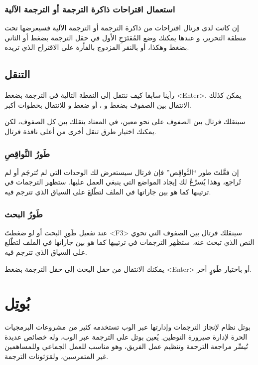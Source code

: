 \subsubsection[ref:36543315]{استعمال اقتراحات ذاكرة الترجمة أو الترجمة الآلية}


إن كانت لدى فرتال اقتراحات من ذاكرة الترجمة أو الترجمة الآلية فسيعرضها
تحت منطقة التحرير، و عندها يمكنك وضع المُقتَرَحِ الأول في حقل الترجمة
بضغط  أو الثاني بضغط  وهكذا، أو بالنقر المزدوج بالفأرة
على الاقتراح الذي تريده.

\subsection{التنقل}
رأينا سابقا كيف ننتقل إلى النقطة التالية في الترجمة بضغط <Enter>. يمكن
كذلك الانتقال بين الصفوف بضغط  و ، أو ضغط
 و  للانتقال بخطوات أكبر.

سينقلك فرتال بين الصفوف على نحو معين، في المعتاد ينقلك بين كل الصفوف،
لكن يمكنك اختيار طرق تنقل أخرى من أعلى نافذة فرتال.

\subsubsection{طَورُ النَّواقِصِ}
إن فعَّلتَ طور “النَّواقِص” فإن فرتال سيستعرض لك الوحدات التي لم تُترجَم
أو لم تُراجع، وهذا يُسرِّعُ لك إيجاد المواضع التي ينبغي العمل عليها.
ستظهر الترجمات في ترتيبها كما هو بين جاراتها في الملف لتطّلعَ على
السياق الذي تترجم فيه.

\subsubsection{طَورُ البحث}
عند تفعيل طَورِ البحث أو لو ضغطتَ <F3> سينقلك فرتال بين الصفوف التي تحوي
النص الذي تبحث عنه. ستظهر الترجمات في ترتيبها كما هو بين جاراتها في
الملف لتطّلع على السياق الذي تترجم فيه.

يمكنك الانتقال من حقل البحث إلى حقل الترجمة بضغط <Enter> أو باختيار
طَورٍ آخر.

\section{بُوتِل}
بوتل نظام لإنجاز الترجمات وإدارتها عبر الوب تستخدمه كثير من مشروعات
البرمجيات الحرة لإدارة صيرورة التوطين. يُعين بوتل على الترجمة عبر الوب،
وله خصائص عديدة تُيسِّر مراجعة الترجمة وتنظيم عمل الفريق، وهو مناسب
للعمل الجماعي وللمساهمين غير المتمرسين، ولمَرَثونات الترجمة.

